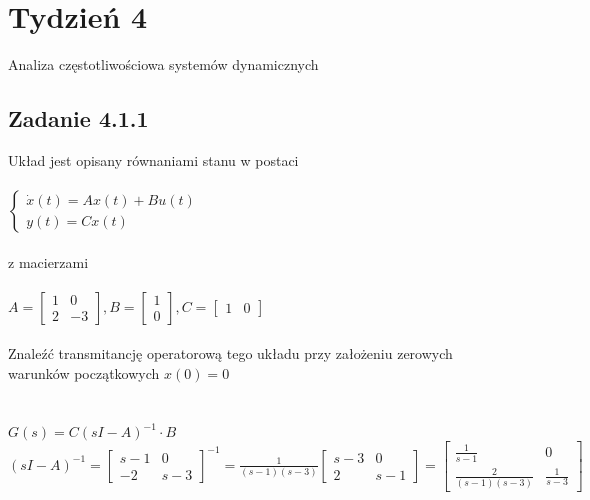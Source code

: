 
\pagebreak
\section*{Tydzień 4}
Analiza częstotliwościowa systemów dynamicznych


\subsection*{Zadanie 4.1.1} {\color{darkgray}
	Układ jest opisany równaniami stanu w postaci\\\\
	$\begin{cases} \dot{x}(t)=Ax(t)+Bu(t)\\y(t)=Cx(t)\end{cases}$\\\\
	z macierzami\\\\
	$A=\left[\begin{array}{cc}1&0\\2&-3\end{array}\right],
	B=\left[\begin{array}{c}1\\0\end{array}\right],
	C=\left[\begin{array}{cc}	1&0\end{array}\right]
	$\\\\
	Znaleźć transmitancję operatorową tego układu przy założeniu zerowych warunków początkowych $x(0)=0$\\
}\lineh
\\\\
$G(s)=C(sI-A)^{-1} \cdot B$\\
$(sI-A)^{-1}=\left[\begin{array}{cc}s-1&0\\-2&s-3\end{array}\right]^{-1}=\frac{1}{(s-1)(s-3)}\left[\begin{array}{cc}s-3&0\\2&s-1\end{array}\right]=\left[\begin{array}{cc}\frac{1}{s-1}&0\\\frac{2}{(s-1)(s-3)}&\frac{1}{s-3}\end{array}\right]$\\

